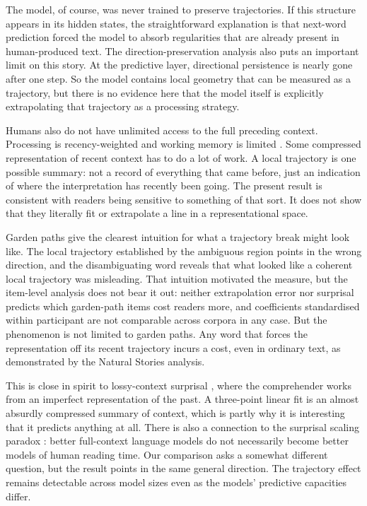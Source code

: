 \documentclass[12pt]{article}
\newcommand{\new}[1]{#1}   %
\begin{document}
The model, of course, was never trained to preserve trajectories. If this structure appears in its hidden states, the straightforward explanation is that next-word prediction forced the model to absorb regularities that are already present in human-produced text. The direction-preservation analysis also puts an important limit on this story. At the predictive layer, directional persistence is nearly gone after one step. So the model contains local geometry that can be measured as a trajectory, but there is no evidence here that the model itself is explicitly extrapolating that trajectory as a processing strategy.

Humans also do not have unlimited access to the full preceding context. Processing is recency-weighted and working memory is limited \citep{gibson1998,lewis2005}. Some compressed representation of recent context has to do a lot of work. A local trajectory is one possible summary: not a record of everything that came before, just an indication of where the interpretation has recently been going. The present result is consistent with readers being sensitive to something of that sort. It does not show that they literally fit or extrapolate a line in a representational space.

Garden paths give the clearest intuition for what a trajectory break might look like. The local trajectory established by the ambiguous region points in the wrong direction, and the disambiguating word reveals that what looked like a coherent local trajectory was misleading. \new{That intuition motivated the measure, but the item-level analysis does not bear it out: neither extrapolation error nor surprisal predicts which garden-path items cost readers more, and coefficients standardised within participant are not comparable across corpora in any case.} But the phenomenon is not limited to garden paths. Any word that forces the representation off its recent trajectory incurs a cost, even in ordinary text, as demonstrated by the Natural Stories analysis.

This is close in spirit to lossy-context surprisal \citep{futrell2020}, where the comprehender works from an imperfect representation of the past. A three-point linear fit is an almost absurdly compressed summary of context, which is partly why it is interesting that it predicts anything at all. There is also a connection to the surprisal scaling paradox \citep{oh2023b}: better full-context language models do not necessarily become better models of human reading time. Our comparison asks a somewhat different question, but the result points in the same general direction. The trajectory effect remains detectable across model sizes even as the models' predictive capacities differ.
\end{document}

